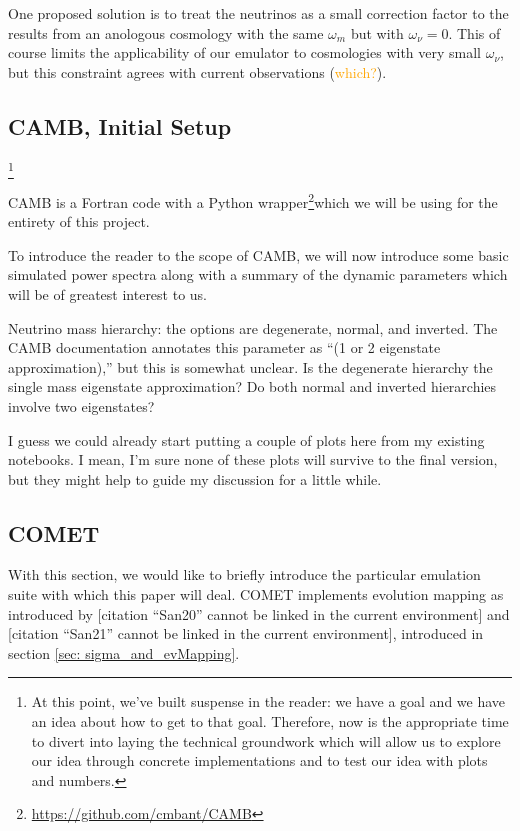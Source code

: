 \documentclass[11pt]{article}
\newcommand{\cbib}[1]
{\IfFileExists{biblatex.sty}
{\cite{#1}}
{[citation ``#1'' cannot be linked in the current environment]}}
\begin{document}
One proposed solution is to treat the neutrinos as a small correction factor
to the results from an anologous cosmology with the same $\omega_m$ but with
$\omega_\nu = 0$. This of course limits the applicability of our emulator to
cosmologies with very small $\omega_\nu$, but this constraint agrees with
current observations (\textcolor{orange}{which?}).

\begin{centering}
\section{CAMB, Initial Setup}
\end{centering}
\footnote{
    At this point, we've built suspense in the reader: we have a goal and
    we have an idea about how to get to that goal. Therefore, now is the
    appropriate time to divert into laying the technical groundwork which
    will allow us to explore our idea through concrete implementations and
    to test our idea with plots and numbers.
}

CAMB is a Fortran code with a Python wrapper\footnote{
\url{https://github.com/cmbant/CAMB}
}which we will be using for the
entirety of this project.

To introduce the reader to the scope of CAMB, we will now introduce
some basic simulated power spectra along with a summary of the dynamic
parameters which will be of greatest interest to us.

Neutrino mass hierarchy: the options are degenerate, normal, and inverted.
The CAMB documentation annotates this parameter as ``(1 or 2 eigenstate
approximation),'' but this is somewhat unclear. Is the degenerate
hierarchy the single mass eigenstate approximation? Do both normal
and inverted hierarchies involve two eigenstates?

I guess we could already start putting a couple of plots here from my existing
notebooks. I mean, I'm sure none of these plots will survive to the final
version, but they might help to guide my discussion for a little while.

\begin{centering}
\section{COMET}
\end{centering}

With this section, we would like to briefly introduce the particular emulation
suite with
which this paper will deal. COMET implements evolution mapping as introduced
by \cbib{San20} and \cbib{San21}, introduced in section
\ref{sec: sigma_and_evMapping}.
\end{document}
